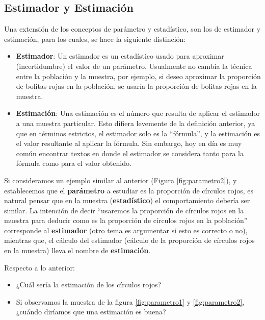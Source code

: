 \documentclass[
]{book}
\providecommand{\tightlist}{%
  \setlength{\itemsep}{0pt}\setlength{\parskip}{0pt}}
\theoremstyle{definition}
\theoremstyle{definition}
\theoremstyle{definition}
\theoremstyle{definition}
\theoremstyle{remark}
\begin{document}
\hypertarget{estimador-y-estimaciuxf3n}{%
\subsection{Estimador y Estimación}\label{estimador-y-estimaciuxf3n}}

Una extensión de los conceptos de parámetro y estadístico, son los de estimador y estimación, para los cuales, se hace la siguiente distinción:

\begin{itemize}
\item
  \textbf{Estimador}: Un estimador es un estadístico usado para aproximar (incertidumbre) el valor de un parámetro. Usualmente no cambia la técnica entre la población y la muestra, por ejemplo, si deseo aproximar la proporción de bolitas rojas en la población, se usaría la proporción de bolitas rojas en la muestra.
\item
  \textbf{Estimación}: Una estimación es el número que resulta de aplicar el estimador a una muestra particular. Esto difiera levemente de la definición anterior, ya que en términos estrictos, el estimador solo es la ``fórmula'', y la estimación es el valor resultante al aplicar la fórmula. Sin embargo, hoy en día es muy común encontrar textos en donde el estimador se considera tanto para la fórmula como para el valor obtenido.
\end{itemize}

Si consideramos un ejemplo similar al anterior (Figura \ref{fig:parametro2}), y establecemos que el \textbf{parámetro} a estudiar es la proporción de círculos rojos, es natural pensar que en la muestra (\textbf{estadístico}) el comportamiento debería ser similar. La intención de decir ``usaremos la proporción de círculos rojos en la muestra para deducir como es la proporción de círculos rojos en la población'' corresponde al \textbf{estimador} (otro tema es argumentar si esto es correcto o no), mientras que, el cálculo del estimador (cálculo de la proporción de círculos rojos en la muestra) lleva el nombre de \textbf{estimación}.

Respecto a lo anterior:

\begin{itemize}
\tightlist
\item
  ¿Cuál sería la estimación de los círculos rojos?
\item
  Si observamos la muestra de la figura \ref{fig:parametro1} y \ref{fig:parametro2}, ¿cuándo diríamos que una estimación es buena?
\end{itemize}
\end{document}
